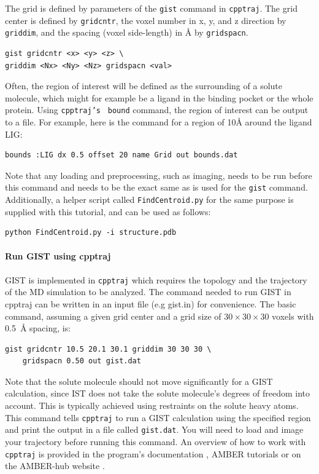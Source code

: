 \documentclass[9pt,tutorial]{livecoms}
\newcommand{\software}{\texttt}
\newcommand\inlinecode{\texttt}
\begin{document}
The grid is defined by parameters of the \inlinecode{gist} command in \software{cpptraj}.
The grid center is defined by \inlinecode{gridcntr}, the voxel number in x, y, and z direction by \inlinecode{griddim}, and the spacing (voxel side-length) in \AA{} by \inlinecode{gridspacn}.

\begin{lstlisting}[style=cpptraj]
gist gridcntr <x> <y> <z> \
griddim <Nx> <Ny> <Nz> gridspacn <val>
\end{lstlisting}

Often, the region of interest will be defined as the surrounding of a solute molecule, which might for example be a ligand in the binding pocket or the whole protein. Using \inlinecode{cpptraj's } \inlinecode{bound} command, the region of interest can be output to a file. For example, here is the command for a region of 10\AA{} around the ligand LIG:
\begin{lstlisting}[style=cpptraj]
bounds :LIG dx 0.5 offset 20 name Grid out bounds.dat
\end{lstlisting}
Note that any loading and preprocessing, such as imaging, needs to be run before this command and needs to be the exact same as is used for the \inlinecode{gist} command.
Additionally, a helper script called \inlinecode{FindCentroid.py} for the same purpose is supplied with this tutorial, and can be used as follows:

\begin{lstlisting}[style=bash]
python FindCentroid.py -i structure.pdb
\end{lstlisting}

\paragraph{Run GIST using cpptraj}
GIST is implemented in \software{cpptraj} which requires the topology and the trajectory of the MD simulation to be analyzed.
The command needed to run GIST in cpptraj can be written in an input file (e.g gist.in) for convenience. The basic command, assuming a given grid center and a grid size of $30\times30\times30$ voxels with \SI{0.5}{\angstrom} spacing, is:

\begin{lstlisting}[style=cpptraj]
gist gridcntr 10.5 20.1 30.1 griddim 30 30 30 \
	gridspacn 0.50 out gist.dat
\end{lstlisting}

Note that the solute molecule should not move significantly for a GIST calculation, since IST does not take the solute molecule's degrees of freedom into account.
This is typically achieved using restraints on the solute heavy atoms.
This command tells \software{cpptraj} to run a GIST calculation using the specified region and print the output in a file called \inlinecode{gist.dat}. You will need to load and image your trajectory before running this command. An overview of how to work with \software{cpptraj} is provided in the program's documentation \cite{cpptraj_doc}, AMBER tutorials \cite{amber_tut_cpptraj} or on the AMBER-hub website \cite{amber_hub}.
\end{document}
